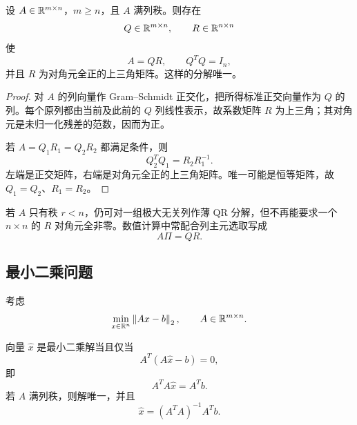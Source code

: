 \begin{theorem}[薄 QR 分解]
设 $A\in\mathbb R^{m\times n}$，$m\geq n$，且 $A$ 满列秩。则存在
\begin{equation}
 Q\in\mathbb R^{m\times n},
 \qquad
 R\in\mathbb R^{n\times n}
\end{equation}
使
\begin{equation}
 A=QR,
 \qquad Q^TQ=I_n,
\end{equation}
并且 $R$ 为对角元全正的上三角矩阵。这样的分解唯一。
\end{theorem}

\begin{proof}
对 $A$ 的列向量作 Gram--Schmidt 正交化，把所得标准正交向量作为 $Q$ 的列。每个原列都由当前及此前的 $Q$ 列线性表示，故系数矩阵 $R$ 为上三角；其对角元是未归一化残差的范数，因而为正。

若 $A=Q_1R_1=Q_2R_2$ 都满足条件，则
\begin{equation}
 Q_2^TQ_1=R_2R_1^{-1}.
\end{equation}
左端是正交矩阵，右端是对角元全正的上三角矩阵。唯一可能是恒等矩阵，故 $Q_1=Q_2$、$R_1=R_2$。
\end{proof}

\begin{remark}
若 $A$ 只有秩 $r<n$，仍可对一组极大无关列作薄 QR 分解，但不再能要求一个 $n\times n$ 的 $R$ 对角元全非零。数值计算中常配合列主元选取写成
\begin{equation}
 A\Pi=QR.
\end{equation}
\end{remark}

\subsection{最小二乘问题}

考虑
\begin{equation}
 \min_{x\in\mathbb R^n}\left\lVert Ax-b\right\rVert_2,
 \qquad A\in\mathbb R^{m\times n}.
\end{equation}

\begin{theorem}[正规方程]
向量 $\widehat x$ 是最小二乘解当且仅当
\begin{equation}
 A^T(A\widehat x-b)=0,
\end{equation}
即
\begin{equation}
 A^TA\widehat x=A^Tb.
\end{equation}
若 $A$ 满列秩，则解唯一，并且
\begin{equation}
 \widehat x=(A^TA)^{-1}A^Tb.
\end{equation}
\end{theorem}

